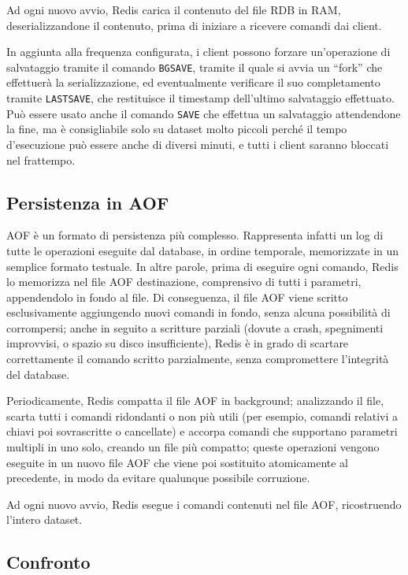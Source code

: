 Ad ogni nuovo avvio, Redis carica il contenuto del file RDB in RAM, deserializzandone il contenuto,
prima di iniziare a ricevere comandi dai client.

In aggiunta alla frequenza configurata, i client possono forzare un'operazione di salvataggio 
tramite il comando \verb|BGSAVE|, tramite il quale si avvia un ``fork'' che effettuerà la
serializzazione, ed eventualmente verificare il suo completamento tramite \verb|LASTSAVE|, che
restituisce il timestamp dell'ultimo salvataggio effettuato. Può essere usato anche il comando
\verb|SAVE| che effettua un salvataggio attendendone la fine, ma è consigliabile solo su dataset
molto piccoli perché il tempo d'esecuzione può essere anche di diversi minuti, e tutti i client
saranno bloccati nel frattempo.


\subsection{Persistenza in AOF}
\label{sec:durability:aof}

AOF è un formato di persistenza più complesso. Rappresenta infatti un log di tutte le operazioni
eseguite dal database, in ordine temporale, memorizzate in un semplice formato testuale. In altre
parole, prima di eseguire ogni comando, Redis lo memorizza nel file AOF destinazione, comprensivo di
tutti i parametri, appendendolo in fondo al file. Di conseguenza, il file AOF viene scritto
esclusivamente aggiungendo nuovi comandi in fondo, senza alcuna possibilità di corrompersi; anche in
seguito a scritture parziali (dovute a crash, spegnimenti improvvisi, o spazio su disco
insufficiente), Redis è in grado di scartare correttamente il comando scritto parzialmente, senza
compromettere l'integrità del database.

Periodicamente, Redis compatta il file AOF in background; analizzando il file, scarta tutti i
comandi ridondanti o non più utili (per esempio, comandi relativi a chiavi poi sovrascritte o
cancellate) e accorpa comandi che supportano parametri multipli in uno solo, creando un file più
compatto; queste operazioni vengono eseguite in un nuovo file AOF che viene poi sostituito
atomicamente al precedente, in modo da evitare qualunque possibile corruzione.

Ad ogni nuovo avvio, Redis esegue i comandi contenuti nel file AOF, ricostruendo l'intero dataset.


\subsection{Confronto}

